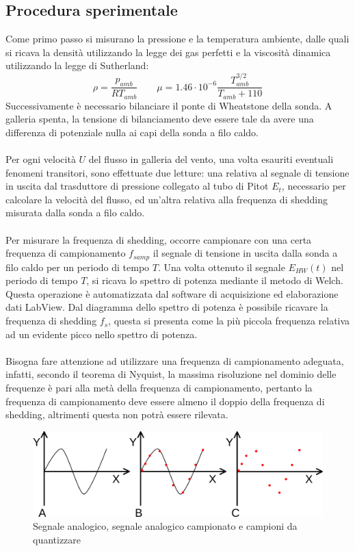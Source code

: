 \subsection{Procedura sperimentale}
Come primo passo si misurano la pressione e la temperatura ambiente, dalle quali si ricava la densità utilizzando la legge dei gas perfetti e la viscosità dinamica utilizzando la legge di Sutherland:
\begin{equation*}
    \rho = \frac{p_{amb}}{RT_{amb}} \qquad \mu = 1.46\cdot10^{-6} \frac{T_{amb}^{3/2}}{T_{amb}+110} 
\end{equation*}
Successivamente è necessario bilanciare il ponte di Wheatstone della sonda. A galleria spenta, la tensione di bilanciamento deve essere tale da avere una differenza di potenziale nulla ai capi della sonda a filo caldo.\\\\
Per ogni velocità $U$ del flusso in galleria del vento, una volta esauriti eventuali fenomeni transitori, sono effettuate due letture: una relativa al segnale di tensione in uscita dal trasduttore di pressione collegato al tubo di Pitot $E_t$, necessario per calcolare la velocità del flusso, ed un'altra relativa alla frequenza di shedding misurata dalla sonda a filo caldo.\\\\
Per misurare la frequenza di shedding, occorre campionare con una certa frequenza di campionamento $f_{samp}$ il segnale di tensione in uscita dalla sonda a filo caldo per un periodo di tempo $T$. Una volta ottenuto il segnale $E_{HW}(t)$ nel periodo di tempo $T$, si ricava lo spettro di potenza mediante il metodo di Welch. Questa operazione è automatizzata dal software di acquisizione ed elaborazione dati LabView. Dal diagramma dello spettro di potenza è possibile ricavare la frequenza di shedding $f_s$, questa si presenta come la più piccola frequenza relativa ad un evidente picco nello spettro di potenza.\\\\
Bisogna fare attenzione ad utilizzare una frequenza di campionamento adeguata, infatti, secondo il teorema di Nyquist, la massima risoluzione nel dominio delle frequenze è pari alla metà della frequenza di campionamento, pertanto la frequenza di campionamento deve essere almeno il doppio della frequenza di shedding, altrimenti questa non potrà essere rilevata.
\begin{figure}[H]
    \centering
    \includegraphics[width=.7\textwidth]{images/10/nyquist.png}
    \caption{Segnale analogico, segnale analogico campionato e campioni da quantizzare}
\end{figure}

